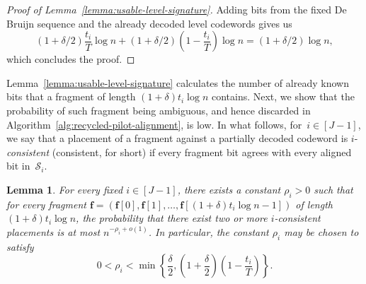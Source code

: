 \documentclass[journal,letterpaper,onecolumn,11pt]{IEEEtran}
\newcommand{\cS}{\mathcal{S}}
\newcommand{\boldf}{\mathbf{f}}
\newtheorem{lemma}{Lemma}
\begin{document}
\begin{proof}[Proof of Lemma~\ref{lemma:usable-level-signature}]
Adding bits from the fixed De Bruijn sequence and the already decoded level codewords gives us $$(1+\delta/2)\frac{t_i}{T}\log n+(1+\delta/2)\left(1-\frac{t_i}{T}\right)\log n=(1+\delta/2)\log n,$$ which concludes the proof.
\end{proof}
Lemma~\ref{lemma:usable-level-signature} calculates the number of already known bits that a fragment of length $(1+\delta)t_i\log n$ contains.
Next, we show that the probability of such fragment being ambiguous, and hence discarded in Algorithm~\ref{alg:recycled-pilot-alignment}, is low.
In what follows, for~$i\in[J-1]$, we say that a placement of a fragment against a partially decoded codeword is $i$-\textit{consistent} (consistent, for short) if every fragment bit agrees with every aligned bit in~$\cS_i$. 

\begin{lemma}\label{lemma:recycled-fragment-ambiguity}
For every fixed \(i\in[J-1]\), there exists a constant \(\rho_i>0\) such that for every fragment $\boldf=(\boldf[0],\boldf[1],\ldots,\boldf[(1+\delta)t_i\log n-1])$ of length \((1+\delta)t_i\log n\), the probability that there exist two or more $i$-consistent placements 
is at most $n^{-\rho_i+o(1)}$.
In particular, the constant \(\rho_i\) may be chosen to satisfy
\[
0<\rho_i<
\min\left\{
\frac{\delta}{2},
\left(1+\frac{\delta}{2}\right)\left(1-\frac{t_i}{T}\right)
\right\}.
\]
\end{lemma}
\end{document}
